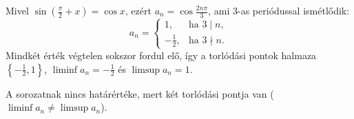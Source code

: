 \documentclass[11pt]{scrartcl}
\begin{document}
Mivel $\sin\left(\frac{\pi}{2} + x\right) = \cos x$, ezért
\(
a_n = \cos \frac{2n\pi}{3}
\),
ami $3$-as periódussal ismétlődik:
\[
	a_n = \begin{cases}
		1,              & \text{ha } 3 \mid n,    \\
		-\frac{1}{2}, & \text{ha } 3 \nmid n.
	\end{cases}
\]
Mindkét érték végtelen sokszor fordul elő, így a torlódási pontok halmaza
$\left\{ -\frac{1}{2}, 1 \right\}$, $\liminf a_n = -\frac{1}{2}$ és
$\limsup a_n = 1$.

A sorozatnak nincs határértéke, mert két torlódási pontja van
($\liminf a_n \ne \limsup a_n$).
\end{document}
